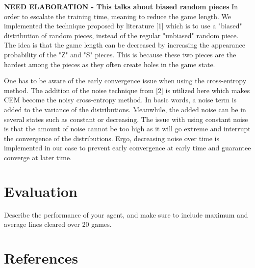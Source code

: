 \documentclass[12pt,letterpaper]{article}
\begin{document}
\textbf{NEED ELABORATION - This talks about biased random pieces}
In order to escalate the training time, meaning to reduce the game length. We implemented the technique proposed by literature [1] which is to use a "biased" distribution of random pieces, instead of the regular "unbiased" random piece. The idea is that the game length can be decreased by increasing the appearance probability of the "Z" and "S" pieces. This is because these two pieces are the hardest among the pieces as they often create holes in the game state. 

One has to be aware of the early convergence issue when using the cross-entropy method. The addition of the noise technique from [2] is utilized here which makes CEM become the noisy cross-entropy method. In basic words, a noise term is added to the variance of the distributions. Meanwhile, the added noise can be in several states such as constant or decreasing. The issue with using constant noise is that the amount of noise cannot be too high as it will go extreme and interrupt the convergence of the distributions. Ergo, decreasing noise over time is implemented in our case to prevent early convergence at early time and guarantee converge at later time.



\section{Evaluation}
Describe the performance of your agent, and make sure to include maximum and average lines cleared over 20 games.

\section{References}
\end{document}
